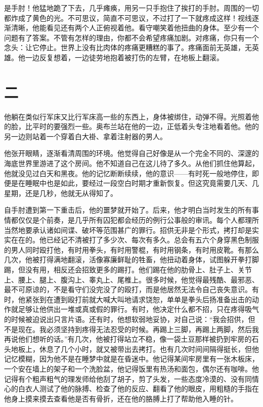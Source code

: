 是手肘！他猛地跪了下去，几乎瘫痪，用另一只手抱住了挨打的手肘。周围的一切都炸成了黄色的光。不可思议，简直不可思议，不过打了一下就疼成这样！视线逐渐清晰，他能看见还有两个人正俯视着他。看守嘲笑着他扭曲的身体。至少有一个问题有了答案。不管有怎样的理由，你都不会希望疼痛加剧。对疼痛，你只有一个念头：让它停止。世界上没有比肉体的疼痛更糟糕的事了。疼痛面前无英雄，无英雄。他一边反复想着，一边徒劳地抱着被打伤的左臂，在地板上翻滚。

\section*{二}\label{ux4e8cux5341}

他躺在类似行军床又比行军床高一些的东西上，身体被绑住，动弹不得。光照着他的脸，比平时的要强烈一些。奥布兰站在他的一边，正低着头专注地看着他。他的另一边则站着一个穿着白大褂、拿着注射器的男人。

他张开眼睛，逐渐看清周围的环境。他觉得自己好像是从一个完全不同的、深邃的海底世界里游进了这个房间。他不知道自己在这儿待了多久。从他们抓住他算起，他就没见过白天和黑夜。他的记忆断断续续，他的意识——有时死一般地停住，即便是在睡眠中也是如此，要经过一段空白时期才重新恢复。但这究竟需要几天、几星期，还是几秒，他就无从得知了。

自手肘遭到第一下重击后，他的噩梦就开始了。后来，他才明白当时发生的所有事情都仅仅是个前奏，是几乎所有囚犯都会经历的例行公事般的审讯。每个人都理所当然地要承认诸如间谍、破坏等范围甚广的罪行。招供无非是个形式，拷打却是实实在在的。他已经记不清被打了多少次、每次有多久。总会有五六个身穿黑色制服的男人同时殴打他，有时用拳头，有时用警棍，有时用钢条，有时用皮靴。有那么几次，他被打得满地翻滚，活像寡廉鲜耻的牲畜，他扭动着身体，试图躲开拳打脚踢，但没有用，相反还会招致更多的踢打。他们踢在他的肋骨上、肚子上、关节上、腰上、腿上、腹沟上、睾丸上、尾椎上。很多时候，他觉得最残酷、最邪恶、最不可原谅的，不是看守们没完没了的殴打，而是他居然无法令自己丧失意识。有时，他紧张到在遭到殴打前就大喊大叫地请求饶恕，单单是拳头后扬准备出击的动作就足够让他供出一堆或真或假的罪行。有时，他决定什么都不招，只在疼得吸气的时候被迫说出只言片语。还有时，他想软弱地妥协，对自己说：``我会招供，但不是现在。我必须坚持到疼得无法忍受的时候。再踢上三脚，再踢上两脚，然后我再说他们想听的话。''有几次，他被打得站立不稳，像一袋土豆那样被扔到牢房的石头地板上，休息了几个小时，就又被带出去拷打。也有几次时间间隔得挺长，但他记忆模糊，因为他不是在睡梦中就是在昏迷中。他记得某间牢房里有一张木板床，一个安在墙上的架子和一个洗脸盆，他记得饭里有热汤和面包，偶尔还有咖啡。他记得有个粗声粗气的理发师给他刮了胡子，剪了头发，一些态度冷漠的、没有同情心的白衣人测试了他的脉搏、检查了他的反应、翻看了他的眼皮，用粗糙的手指在他身上摸来摸去查看他是否有骨折，还在他的胳膊上打了帮助他入睡的针。

